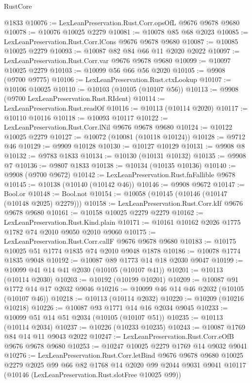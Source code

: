 \begin{lexlean}{RustCore}
\begin{coremodule}
    @1833
@10076 := LexLeanPreservation.Rust.Corr.opsOfL @9676 @9678 @9680
@10078 := @10076 @10025 @2279
@10081 := @10078 @85 @68 @2023
@10085 := LexLeanPreservation.Rust.Corr.lCons @9676 @9678 @9680
@10087 := @10085 @10025 @2279
@10093 := @10087 @82 @84 @66 @11 @2020 @2022
@10097 := LexLeanPreservation.Rust.Corr.var @9676 @9678 @9680
@10099 := @10097 @10025 @2279
@10103 := @10099 @56 @66 @56 @2020
@10105 := @9908 (@9700 @9775)
@10106 := LexLeanPreservation.Rust.ctxLookup
@10107 := @10106 @10025
@10110 := @10103 (@10105 (@10107 @56))
@10113 := @9908 (@9700 LexLeanPreservation.Rust.RIdent)
@10114 := LexLeanPreservation.Rust.readOf
@10116 := @10113 (@10114 @2020)
@10117 := @10110 @10116
@10118 := @10093 @10117
@10122 := LexLeanPreservation.Rust.Corr.lNil @9676 @9678 @9680
@10124 := @10122 @10025 @2279
@10127 := @10072 (@10081 (@10118 @10124))
@10128 := @9712 @46
@10129 := @9909 @10128
@10130 := @10127 @10129
@10131 := @9908 @8
@10132 := @9783 @1833
@10134 := @10130 (@10131 @10132)
@10135 := @9908 @7
@10136 := @9807 @1833
@10138 := @10134 (@10135 @10136)
@10140 := @9908 (@9700 @9672)
@10142 := LexLeanPreservation.Rust.fnFallible @9678
@10145 := @10138 (@10140 (@10142 @46))
@10146 := @9908 @9672
@10147 := Bool.or
@10148 := Bool.not
@10154 := @10058 (@10145 (@10146 (@10147 (@10148 @2025) @2279)))
@10158 := LexLeanPreservation.Rust.Corr.kIf @9676 @9678 @9680
@10161 := @10158 @10025 @2279 @2279
@10162 := LexLeanPreservation.Rust.Kind.plain
@10171 := @10161 @10162 @2026 @1775 @1782 @74 @2010 @9050 @2010 @9060
@10175 := LexLeanPreservation.Rust.Corr.callF @9676 @9678 @9680
@10183 := @10175 @10025 @51 @1774 @1835 @74 @2010 @9048 @1878
@10186 := @10078 @1774 @1835 @9048
@10192 := @10087 @89 @1773 @14 @18 @2030 @9047
@10199 := @10099 @41 @14 @41 @2030 (@10105 (@10107 @41))
@10201 := @10113 (@10114 @2030)
@10203 := @10192 (@10199 @10201)
@10209 := @10087 @91 @1772 @14 @17 @2032 @9046
@10216 := @10099 @46 @14 @46 @2032 (@10105 (@10107 @46))
@10218 := @10113 (@10114 @2032)
@10220 := @10209 (@10216 @10218)
@10226 := @10087 @93 @1771 @14 @16 @2034 @9045
@10233 := @10099 @51 @14 @51 @2034 (@10105 (@10107 @51))
@10235 := @10113 (@10114 @2034)
@10237 := @10226 (@10233 @10235)
@10243 := @10087 @1769 @84 @14 @11 @9043 @2022
@10247 := LexLeanPreservation.Rust.Corr.eOfB @9676 @9678 @9680
@10253 := @10247 @10025 @2279 @1769 @14 @9032 @9041
@10276 := LexLeanPreservation.Rust.Corr.letBind
    @9676
    @9678
    @9680
    @10025
    @2279
    @2025
    @99
    @66
    @82
    @1768
    @14
    @2020
    @99
    @2044
    @9031
    @9041
    @10117
    (@10146 (LexLeanPreservation.Rust.slotFree @10025 @99))

\end{coremodule}
\end{lexlean}
